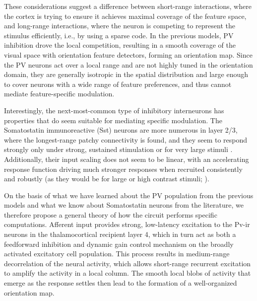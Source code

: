 These considerations suggest a difference between short-range
interactions, where the cortex is trying to ensure it achieves maximal
coverage of the feature space, and long-range interactions, where the
neuron is competing to represent the stimulus efficiently, i.e., by
using a sparse code. In the previous models, PV inhibition drove the
local competition, resulting in a smooth coverage of the visual space
with orientation feature detectors, forming an orientation map. Since
the PV neurons act over a local range and are not highly tuned in the
orientation domain, they are generally isotropic in the spatial
distribution and large enough to cover neurons with a wide range of
feature preferences, and thus cannot mediate feature-specific
modulation.

Interestingly, the next-most-common type of inhibitory interneurons
has properties that do seem suitable for mediating specific modulation.
The Somatostatin immunoreactive (Sst) neurons \citep{Gonchar2007,Xu2010} 
are more numerous in layer 2/3, where the longest-range patchy
connectivity is found, and they seem to respond strongly only under
strong, sustained stimulation \citep{Ma2011} or for very large stimuli
\citep{Adesnik2012}. Additionally, their input scaling does not seem to
be linear, with an accelerating response function driving much stronger
responses when recruited consistently and robustly (as they would be
for large or high contrast stimuli; \citealt{Beierlein2003,Bartley2008,Tan2008}).

On the basis of what we have learned about the PV population from the
previous models and what we know about Somatostatin neurons from the
literature, we therefore propose a general theory of how the circuit
performs specific computations. Afferent input provides strong,
low-latency excitation to the Pv-ir neurons in the thalamocortical
recipient layer 4, which in turn act as both a feedforward inhibition
and dynamic gain control mechanism on the broadly activated excitatory
cell population. This process results in medium-range decorrelation of the neural
activity, which allows short-range recurrent excitation to amplify the activity in
a local column.  The smooth local blobs of activity that emerge as the
response settles then lead to the formation of a well-organized orientation
map.

